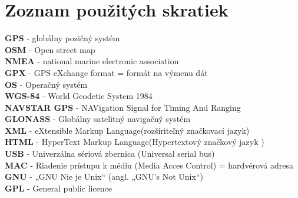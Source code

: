 \newpage
\chapter*{Zoznam použitých skratiek}


\thispagestyle{empty}

\textbf{GPS} - globálny pozičný systém\\
\textbf{OSM} - Open street map\\
\textbf{NMEA} - national marine electronic association\\
\textbf{GPX} - GPS eXchange format = formát na výmenu dát\\
\textbf{OS} - Operačný systém\\
\textbf{WGS-84} - World Geodetic System 1984\\
\textbf{NAVSTAR GPS} - NAVigation Signal for Timing And Ranging\\
\textbf{GLONASS} - Globálny satelitný navigačný systém\\
\textbf{XML} - eXtensible Markup Language(rozšíriteľný značkovací jazyk)\\
\textbf{HTML} - HyperText Markup Language(Hypertextový značkový jazyk )\\
\textbf{USB} - Univerzálna sériová zbernica (Universal serial bus)\\
\textbf{MAC} - Riadenie prístupu k médiu (Media Acces Control) = hardvérová adresa\\
\textbf{GNU} - „GNU Nie je Unix“ (angl. „GNU's Not Unix“)\\
\textbf{GPL} - General public licence\\

